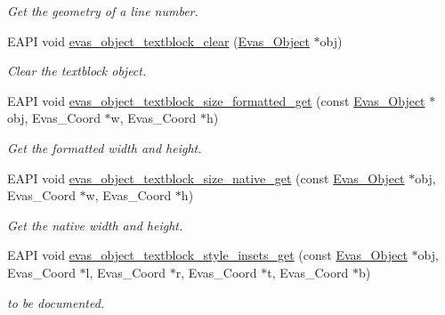 \begin{DoxyCompactItemize}
\begin{DoxyCompactList}\small\item\em Get the geometry of a line number. \item\end{DoxyCompactList}\item 
EAPI void \hyperlink{group__Evas__Object__Textblock_gad5ee9184f370f602d2005ea8091a2c29}{evas\_\-object\_\-textblock\_\-clear} (\hyperlink{group__Evas__Object__Group_ga9e19e6dd1f517a0ba437c0114d3e7c97}{Evas\_\-Object} $\ast$obj)
\begin{DoxyCompactList}\small\item\em Clear the textblock object. \item\end{DoxyCompactList}\item 
EAPI void \hyperlink{group__Evas__Object__Textblock_ga5b77e11b6e478b81ed13d469cb8e21db}{evas\_\-object\_\-textblock\_\-size\_\-formatted\_\-get} (const \hyperlink{group__Evas__Object__Group_ga9e19e6dd1f517a0ba437c0114d3e7c97}{Evas\_\-Object} $\ast$obj, Evas\_\-Coord $\ast$w, Evas\_\-Coord $\ast$h)
\begin{DoxyCompactList}\small\item\em Get the formatted width and height. \item\end{DoxyCompactList}\item 
EAPI void \hyperlink{group__Evas__Object__Textblock_ga9a956c2712537a1e1f83e997c79a4c1e}{evas\_\-object\_\-textblock\_\-size\_\-native\_\-get} (const \hyperlink{group__Evas__Object__Group_ga9e19e6dd1f517a0ba437c0114d3e7c97}{Evas\_\-Object} $\ast$obj, Evas\_\-Coord $\ast$w, Evas\_\-Coord $\ast$h)
\begin{DoxyCompactList}\small\item\em Get the native width and height. \item\end{DoxyCompactList}\item 
EAPI void \hyperlink{group__Evas__Object__Textblock_ga851cb385b547a958790a0d60d386a1d8}{evas\_\-object\_\-textblock\_\-style\_\-insets\_\-get} (const \hyperlink{group__Evas__Object__Group_ga9e19e6dd1f517a0ba437c0114d3e7c97}{Evas\_\-Object} $\ast$obj, Evas\_\-Coord $\ast$l, Evas\_\-Coord $\ast$r, Evas\_\-Coord $\ast$t, Evas\_\-Coord $\ast$b)
\begin{DoxyCompactList}\small\item\em to be documented. \item\end{DoxyCompactList}\end{DoxyCompactItemize}


